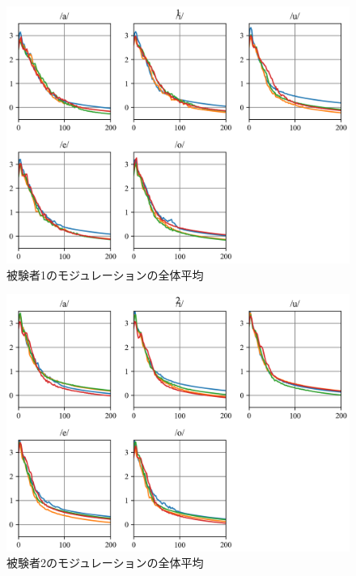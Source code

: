 \documentclass[10.5ptj,a4j,dvipdfmx,uplatex, oneside, openany]{jsbook}%
\begin{document}
\begin{figure}[htbp]
    \begin{center}
      \includegraphics[clip,width=12.0cm]{long_spectrogram_1.png}
      \caption{被験者1のモジュレーションの全体平均}
      \label{long_spectrogram_1}
    \end{center}
\end{figure}

\begin{figure}[htbp]
    \begin{center}
      \includegraphics[clip,width=12.0cm]{long_spectrogram_2.png}
      \caption{被験者2のモジュレーションの全体平均}
      \label{long_spectrogram_2}
    \end{center}
\end{figure}
\end{document}
